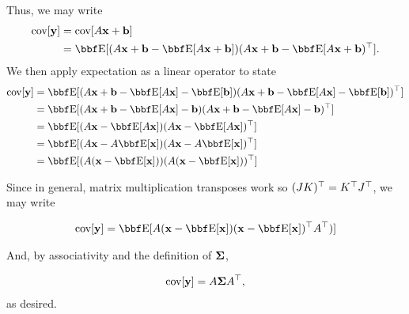 \documentclass[12pt,letterpaper]{hmcpset}
\begin{document}
\begin{solution}
\begin{enumerate}
Thus, we may write
\begin{align*}
	\cov[\yy] &= \cov[A\xx + \bb] \\
	&= \EE [ (A\xx + \bb - \EE[A\xx + \bb ])(A\xx + \bb  - \EE[A\xx + \bb )^\T ].
\end{align*}
We then apply expectation as a linear operator to state
\begin{align*}
	\cov[\yy] &= \EE [ (A\xx + \bb - \EE[A\xx]  - \EE[\bb ])(A\xx + \bb  - \EE[A\xx] - \EE[\bb] )^\T ]\\
	&= \EE [ (A\xx + \bb - \EE[A\xx]  - \bb)(A\xx + \bb  - \EE[A\xx] - \bb )^\T ] \\
	&= \EE [ (A\xx - \EE[A\xx] )(A\xx  - \EE[A\xx] )^\T ]\\
	&= \EE [ (A\xx - A\EE[\xx] )(A\xx  - A\EE[\xx] )^\T ]\\
	&= \EE [ (A (\xx - \EE[\xx]) )(A(\xx  - \EE[\xx]) )^\T ]\\
\end{align*}

Since in general, matrix multiplication transposes work so $(JK)^\top = K^\top J^\top$, we may write

\begin{align*}
	\cov[\yy] &= \EE [ A (\xx - \EE[\xx])(\xx  - \EE[\xx])^\T A^\T) ]\\
\end{align*}

And, by associativity and the definition of $\hbox{\boldmath$\Sigma$}$, 

\begin{align*}
	{\hbox{cov}}[{\bf y}] = A\hbox{\boldmath$\Sigma$} A^\top,
\end{align*}
as desired.

\end{enumerate}
    \vfill
\end{solution}
\newpage
\end{document}
